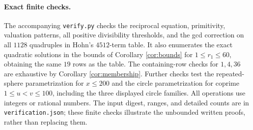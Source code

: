 \documentclass[11pt]{article}
\begin{document}
\paragraph{Exact finite checks.}
The accompanying \texttt{verify.py} checks the reciprocal equation,
primitivity, valuation patterns, all positive divisibility thresholds, and
the gcd correction on all $1128$ quadruples in Hohn's $4512$-term table.
It also enumerates the exact quadratic solutions in the bounds of
Corollary \ref{cor:bounds} for $1\le r_1\le60$, obtaining the same $19$
rows as the table. The containing-row checks for $1,4,36$ are exhaustive
by Corollary \ref{cor:membership}. Further checks test the repeated-sphere
parametrization for $x\le200$ and the circle parametrization for coprime
$1\le u<v\le100$, including the three displayed circle families.
All operations use integers or rational numbers.
The input digest, ranges, and detailed counts are in
\texttt{verification.json}; these finite checks illustrate the unbounded
written proofs, rather than replacing them.
\end{document}
